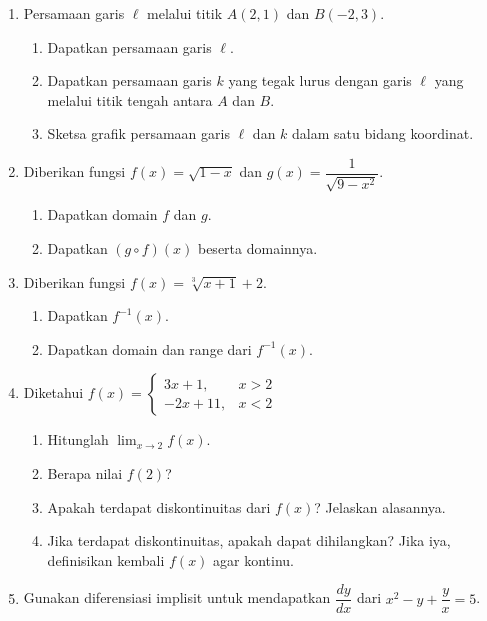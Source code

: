 \documentclass[10pt,openany,a4paper]{article}
\begin{document}
\begin{enumerate}
    \item Persamaan garis $\ell$ melalui titik $A(2,1)$ dan $B(-2,3)$.
    \begin{enumerate}
        \item Dapatkan persamaan garis $\ell$.
        \item Dapatkan persamaan garis $k$ yang tegak lurus dengan garis $\ell$ yang melalui titik tengah antara $A$ dan $B$.
        \item Sketsa grafik persamaan garis $\ell$ dan $k$ dalam satu bidang koordinat.
    \end{enumerate}

    \item Diberikan fungsi $f(x) = \sqrt{1 - x}$ dan $g(x) = \dfrac{1}{\sqrt{9 - x^2}}$.
    \begin{enumerate}
        \item Dapatkan domain $f$ dan $g$.
        \item Dapatkan $(g \circ f)(x)$ beserta domainnya.
    \end{enumerate}

    \item Diberikan fungsi $f(x) = \sqrt[3]{x + 1} + 2$.
    \begin{enumerate}
        \item Dapatkan $f^{-1}(x)$.
        \item Dapatkan domain dan range dari $f^{-1}(x)$.
    \end{enumerate}

    \item Diketahui $ f(x) =  \begin{cases} 3x + 1, & x > 2 \\ -2x + 11, & x < 2 \end{cases} $
    \begin{enumerate}
        \item Hitunglah $\displaystyle \lim_{x \to 2} f(x)$.
        \item Berapa nilai $f(2)$?
        \item Apakah terdapat diskontinuitas dari $f(x)$? Jelaskan alasannya.
        \item Jika terdapat diskontinuitas, apakah dapat dihilangkan? Jika iya, definisikan kembali $f(x)$ agar kontinu.
    \end{enumerate}

    \item Gunakan diferensiasi implisit untuk mendapatkan $\dfrac{dy}{dx}$ dari $x^2 - y + \dfrac{y}{x} = 5$.
\end{enumerate}
	
\end{document}
